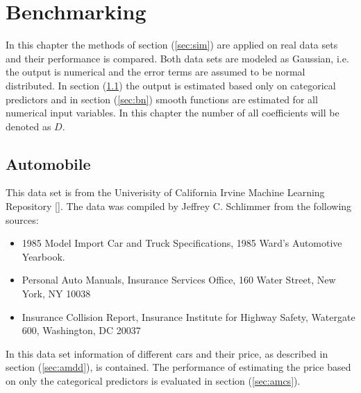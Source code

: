 \documentclass[12pt,letterpaper]{article}
\numberwithin{equation}{subsection}
\begin{document}
\section{Benchmarking}
\label{sec:benchmark}
In this chapter the methods of section (\ref{sec:sim}) are applied on real data sets and their performance is compared. Both data sets are modeled as Gaussian, i.e. the output is numerical and the error terms are assumed to be normal distributed. In section (\ref{sec:am}) the output is estimated based only on categorical predictors and in section (\ref{sec:bn}) smooth functions are estimated for all numerical input variables. In this chapter the number of all coefficients will be denoted as $D$.
\subsection{Automobile}
\label{sec:am}
This data set is from the Univerisity of California Irvine Machine Learning Repository [\cite{uci}]. The data was compiled by Jeffrey C. Schlimmer from the following sources:
\begin{itemize}
\item 1985 Model Import Car and Truck Specifications, 1985 Ward's Automotive Yearbook.
\item Personal Auto Manuals, Insurance Services Office, 160 Water Street, New York, NY 10038
\item Insurance Collision Report, Insurance Institute for Highway Safety, Watergate 600, Washington, DC 20037
\end{itemize}
In this data set information of different cars and their price, as described in section (\ref{sec:amdd}), is contained. The performance of estimating the price based on only the categorical predictors is evaluated in section (\ref{sec:amcs}).
\end{document}
